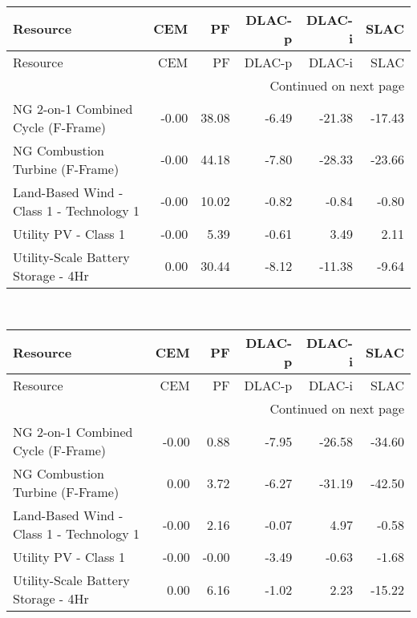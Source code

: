 \documentclass{article}
\begin{document}
\hline
{} \\
\hline
\begin{longtable}{lrrrrr}
\toprule
Resource & CEM & PF & DLAC-p & DLAC-i & SLAC \\
\midrule
\endfirsthead
\toprule
Resource & CEM & PF & DLAC-p & DLAC-i & SLAC \\
\midrule
\endhead
\midrule
\multicolumn{6}{r}{Continued on next page} \\
\midrule
\endfoot
\bottomrule
\endlastfoot
NG 2-on-1 Combined Cycle (F-Frame) & -0.00 & 38.08 & -6.49 & -21.38 & -17.43 \\
NG Combustion Turbine (F-Frame) & -0.00 & 44.18 & -7.80 & -28.33 & -23.66 \\
Land-Based Wind - Class 1 - Technology 1 & -0.00 & 10.02 & -0.82 & -0.84 & -0.80 \\
Utility PV - Class 1 & -0.00 & 5.39 & -0.61 & 3.49 & 2.11 \\
Utility-Scale Battery Storage - 4Hr & 0.00 & 30.44 & -8.12 & -11.38 & -9.64 \\
\end{longtable}


\hline
{} \\
\hline
\begin{longtable}{lrrrrr}
\toprule
Resource & CEM & PF & DLAC-p & DLAC-i & SLAC \\
\midrule
\endfirsthead
\toprule
Resource & CEM & PF & DLAC-p & DLAC-i & SLAC \\
\midrule
\endhead
\midrule
\multicolumn{6}{r}{Continued on next page} \\
\midrule
\endfoot
\bottomrule
\endlastfoot
NG 2-on-1 Combined Cycle (F-Frame) & -0.00 & 0.88 & -7.95 & -26.58 & -34.60 \\
NG Combustion Turbine (F-Frame) & 0.00 & 3.72 & -6.27 & -31.19 & -42.50 \\
Land-Based Wind - Class 1 - Technology 1 & -0.00 & 2.16 & -0.07 & 4.97 & -0.58 \\
Utility PV - Class 1 & -0.00 & -0.00 & -3.49 & -0.63 & -1.68 \\
Utility-Scale Battery Storage - 4Hr & 0.00 & 6.16 & -1.02 & 2.23 & -15.22 \\
\end{longtable}
\end{document}
